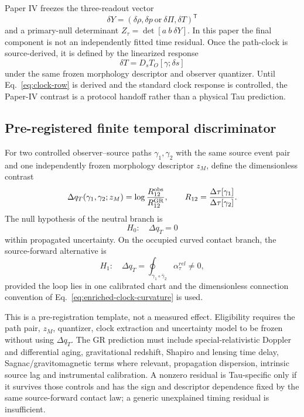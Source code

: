\documentclass[11pt]{article}
\begin{document}
Paper IV freezes the three-readout vector
\begin{equation}
 \delta Y=(\delta\rho,\delta p\ \text{or}\ \delta\Pi,\delta T)^{\mathsf T}
\end{equation}
and a primary-null determinant \(Z_\tau=\det[a\ b\ \delta Y]\). In this paper
the final component is not an independently fitted time residual. Once the
path-clock is source-derived, it is defined by the linearized response
\begin{equation}
 \delta T= D_s T_O[\gamma;\delta s]
 \label{eq:clock-row}
\end{equation}
under the same frozen morphology descriptor and observer quantizer. Until
Eq.~\eqref{eq:clock-row} is derived and the standard clock response is
controlled, the Paper-IV contrast is a protocol handoff rather than a physical
Tau prediction.

\subsection{Pre-registered finite temporal discriminator}

For two controlled observer--source paths \(\gamma_1,\gamma_2\) with the same
source event pair and one independently frozen morphology descriptor \(z_M\),
define the dimensionless contrast
\begin{equation}
 \Delta q_T(\gamma_1,\gamma_2;z_M)
 =\log\frac{R_{12}^{\rm obs}}{R_{12}^{\rm GR}},
 \qquad
 R_{12}=\frac{\Delta\tau[\gamma_1]}{\Delta\tau[\gamma_2]}.
 \label{eq:finite-temporal-discriminator}
\end{equation}
The null hypothesis of the neutral branch is
\begin{equation}
 H_0:\quad \Delta q_T=0
 \label{eq:temporal-null}
\end{equation}
within propagated uncertainty. On the occupied curved contact branch, the
source-forward alternative is
\begin{equation}
 H_1:\quad \Delta q_T
 =\oint_{\gamma_1\circ\bar\gamma_2}\alpha_\tau^{rel}\ne0,
 \label{eq:temporal-alternative}
\end{equation}
provided the loop lies in one calibrated chart and the dimensionless
connection convention of Eq.~\eqref{eq:enriched-clock-curvature} is used.

This is a pre-registration template, not a measured effect. Eligibility
requires the path pair, \(z_M\), quantizer, clock extraction and uncertainty
model to be frozen without using \(\Delta q_T\). The GR prediction must include
special-relativistic Doppler and differential aging, gravitational redshift,
Shapiro and lensing time delay, Sagnac/gravitomagnetic terms where relevant,
propagation dispersion, intrinsic source lag and instrumental calibration.
A nonzero residual is Tau-specific only if it survives those controls and has
the sign and descriptor dependence fixed by the same source-forward contact
law; a generic unexplained timing residual is insufficient.
\end{document}
